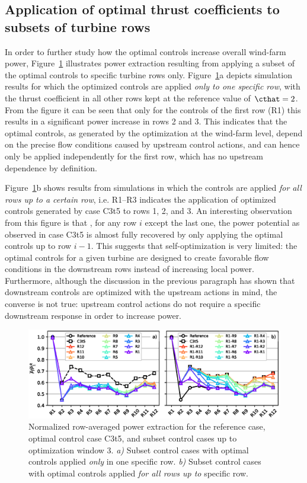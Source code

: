 	\subsection{Application of optimal thrust coefficients to subsets of turbine rows}\label{sec:application_subset}

	In order to further study how the optimal controls increase overall wind-farm power, Figure~\ref{fig:multirow} illustrates power extraction resulting from applying a subset of the optimal controls to specific turbine rows only. Figure~\ref{fig:multirow}a depicts simulation results for which the  optimized controls are applied \emph{only to one specific row}, with the thrust coefficient in all other rows kept at the reference value of $\cthat = 2$. From the figure it can be seen that only for the controls of the first row (R1) this results in a significant power increase in rows 2 and 3. This indicates that the optimal controls, as generated by the optimization at the wind-farm level, depend on the precise flow conditions caused by upstream control actions, and can hence only be applied independently for the first row, which has no upstream dependence by definition. 
	
	Figure~\ref{fig:multirow}b shows results from simulations in which the controls are applied \emph{for all rows up to a certain row}, i.e. R1--R3 indicates the application of optimized controls generated by case C3t5 to rows 1, 2, and 3. An interesting observation from this figure is that , for any row $i$ except the last one, the power potential as observed in case C3t5 is almost fully recovered by only applying the optimal controls up to row $i-1$. This suggests that self-optimization is very limited: the optimal controls for a given turbine are designed to create favorable flow conditions in the downstream rows instead of increasing local power. Furthermore, although the discussion in the previous paragraph has shown that downstream controls are optimized with the upstream actions in mind, the converse is not true: upstream control actions do not require a specific downstream response in order to increase power. 
	
	\begin{figure}
		\includegraphics[width=\textwidth]{chapters/analysis_induction_control/multirow.eps}
		\caption{Normalized row-averaged power extraction for the reference case, optimal control case C3t5, and subset control cases up to optimization window 3. \emph{a)} Subset control cases with optimal controls applied \emph{only} in one specific row. \emph{b)} Subset control cases with optimal controls applied \emph{for all rows up to} specific row. \label{fig:multirow}}
	\end{figure}

